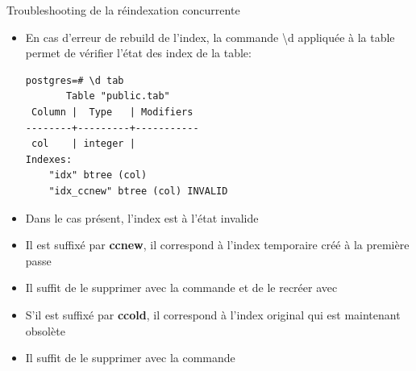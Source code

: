 \begin{frame}[fragile]{Troubleshooting de la réindexation concurrente}

\begin{itemize}
   \item En cas d'erreur de rebuild de l'index, la commande \textbackslash d appliquée à la table permet de vérifier l'état des index de la table:
\begin{tiny}
\begin{Verbatim}[commandchars=\&\`\!]
   postgres=# \d tab
       Table "public.tab"
 Column |  Type   | Modifiers
--------+---------+-----------
 col    | integer |
Indexes:
    "idx" btree (col)
    "idx_ccnew" btree (col) INVALID
\end{Verbatim}
\end{tiny}
   \item Dans le cas présent, l'index est à l'état invalide
   \item Il est suffixé par \textbf{ccnew}, il correspond à l'index temporaire créé à la première passe
   \item Il suffit de le supprimer avec la commande  et de le recréer avec 
   \item S'il est suffixé par \textbf{ccold}, il correspond à l'index original qui est maintenant obsolète
   \item Il suffit de le supprimer avec la commande 

\end{itemize}

\end{frame}


